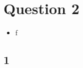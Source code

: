 
\section{Question 2}

\begin{itemize}
    \item  f
\end{itemize}

\begin{solve}

    \subsection{1}

    
\end{solve}